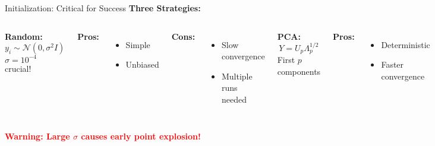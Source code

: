 \documentclass[aspectratio=169]{beamer}
\newcommand{\conceptbox}[2]{\colorbox{#1!20}{\textcolor{#1}{\textbf{#2}}}}
\newcommand{\warning}[1]{\conceptbox{red}{Warning: #1}}
\begin{document}
\begin{frame}{Initialization: Critical for Success}
\textbf{Three Strategies:}

\begin{columns}
\textbf{Random:}
$$y_i \sim \mathcal{N}(0, \sigma^2 I)$$
$\sigma = 10^{-4}$ crucial!

\textbf{Pros:}
\begin{itemize}
\item Simple
\item Unbiased
\end{itemize}

\textbf{Cons:}
\begin{itemize}
\item Slow convergence
\item Multiple runs needed
\end{itemize}

\textbf{PCA:}
$$Y = U_p \Lambda_p^{1/2}$$
First $p$ components

\textbf{Pros:}
\begin{itemize}
\item Deterministic
\item Faster convergence
\end{itemize}

\textbf{Cons:}
\begin{itemize}
\item Linear bias
\item May miss structure
\end{itemize}

\textbf{Laplacian Eigenmaps:}
$$Y = \text{eigvecs}(L)$$
Graph Laplacian

\textbf{Pros:}
\begin{itemize}
\item Manifold-aware
\item Good for graphs
\end{itemize}

\textbf{Cons:}
\begin{itemize}
\item Expensive
\item Parameter sensitive
\end{itemize}
\end{columns}

\vspace{0.3cm}
\warning{Large $\sigma$ causes early point explosion!}
\end{frame}
\end{document}
